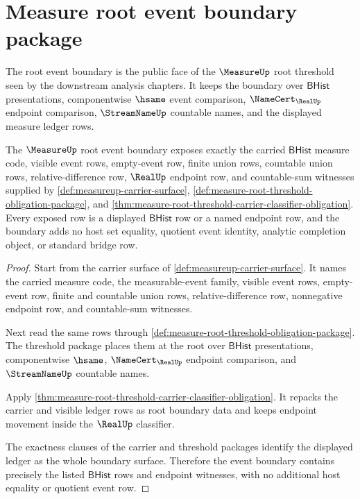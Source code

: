 \section{Measure root event boundary package}
\label{sec:measure-root-event-boundary-package}

The root event boundary is the public face of the $\MeasureUp$ root threshold
seen by the downstream analysis chapters. It keeps the boundary over
$\mathsf{BHist}$ presentations, componentwise $\hsame$ event comparison,
$\NameCert_{\RealUp}$ endpoint comparison, $\StreamNameUp$ countable names,
and the displayed measure ledger rows.

\begin{theorem}
\label{thm:measure-root-event-boundary-carrier}
The $\MeasureUp$ root event boundary exposes exactly the carried
$\mathsf{BHist}$ measure code, visible event rows, empty-event row, finite
union rows, countable union rows, relative-difference row, $\RealUp$ endpoint
row, and countable-sum witnesses supplied by
\autoref{def:measureup-carrier-surface},
\autoref{def:measure-root-threshold-obligation-package}, and
\autoref{thm:measure-root-threshold-carrier-classifier-obligation}. Every
exposed row is a displayed $\mathsf{BHist}$ row or a named endpoint row, and
the boundary adds no host set equality, quotient event identity, analytic
completion object, or standard bridge row.
\end{theorem}
\begin{proof}
Start from the carrier surface of \autoref{def:measureup-carrier-surface}.
It names the carried measure code, the measurable-event family, visible
event rows, empty-event row, finite and countable union rows,
relative-difference row, nonnegative endpoint row, and countable-sum
witnesses.

Next read the same rows through
\autoref{def:measure-root-threshold-obligation-package}. The threshold
package places them at the root over $\mathsf{BHist}$ presentations,
componentwise $\hsame$, $\NameCert_{\RealUp}$ endpoint comparison, and
$\StreamNameUp$ countable names.

Apply \autoref{thm:measure-root-threshold-carrier-classifier-obligation}.
It repacks the carrier and visible ledger rows as root boundary data and
keeps endpoint movement inside the $\RealUp$ classifier.

The exactness clauses of the carrier and threshold packages identify the
displayed ledger as the whole boundary surface. Therefore the event boundary
contains precisely the listed $\mathsf{BHist}$ rows and endpoint witnesses,
with no additional host equality or quotient event row.
\end{proof}

